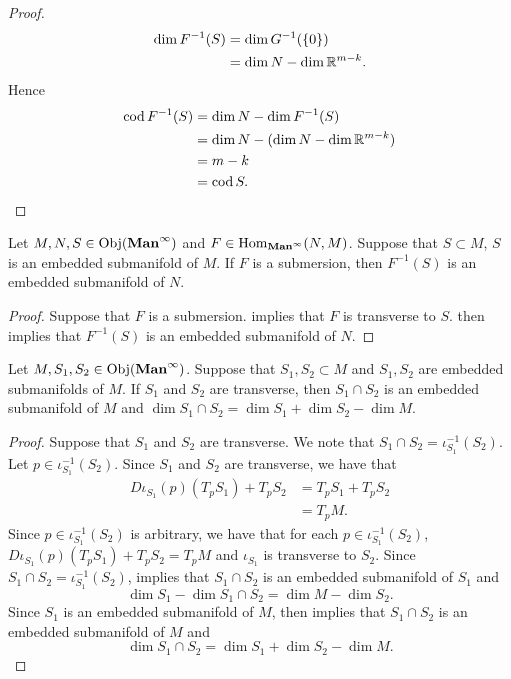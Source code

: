 \documentclass{book}
\begin{document}
\begin{proof}
		\begin{align*}
			\dim F^{-1}(S) 
			& = \dim G^{-1}(\{0\}) \\
			& = \dim N - \dim  \mathbb{R}^{m-k}.
		\end{align*}
		Hence
		\begin{align*}
			\operatorname{cod} F^{-1}(S)
			& = \dim N - \dim F^{-1}(S) \\
			& = \dim N - (\dim N - \dim \mathbb{R}^{m-k}) \\
			& = m - k \\
			& = \operatorname{cod} S.
		\end{align*}
	\end{proof}

	\begin{ex} 
		Let $M, N, S \in \operatorname{Obj}(\operatorname*{\text{\textbf{Man}}^{\infty}})$ and $F \in \operatorname{Hom}_{\operatorname*{\text{\textbf{Man}}^{\infty}}}(N, M)$. Suppose that $S \subset M$, $S$ is an embedded submanifold of $M$. If $F$ is a submersion, then $F^{-1}(S)$ is an embedded submanifold of $N$.
	\end{ex}

	\begin{proof}
		Suppose that $F$ is a submersion.  implies that $F$ is transverse to $S$.  then implies that $F^{-1}(S)$ is an embedded submanifold of $N$.
	\end{proof}

	\begin{ex} 
		Let $M, S_1, S_2 \in \operatorname{Obj}(\operatorname*{\text{\textbf{Man}}^{\infty}})$. Suppose that $S_1, S_2 \subset M$ and $S_1, S_2$ are embedded submanifolds of $M$. If $S_1$ and $S_2$ are transverse, then $S_1 \cap S_2$ is an embedded submanifold of $M$ and $\dim S_1 \cap S_2 = \dim S_1 + \dim S_2 - \dim M$. 
	\end{ex}

	\begin{proof}
		Suppose that $S_1$ and $S_2$ are transverse. We note that $S_1 \cap S_2 = \iota_{S_1}^{-1}(S_2)$. Let $p \in \iota_{S_1}^{-1}(S_2)$. Since $S_1$ and $S_2$ are transverse, we have that
		\begin{align*}
			D\iota_{S_1}(p)(T_p S_1) + T_pS_2
			& = T_p S_1 + T_p S_2 \\
			& = T_pM.
		\end{align*} 
		Since $p \in \iota_{S_1}^{-1}(S_2)$ is arbitrary, we have that for each $p \in \iota_{S_1}^{-1}(S_2)$, $D\iota_{S_1}(p)(T_p S_1) + T_pS_2 = T_pM$ and $\iota_{S_1}$ is transverse to $S_2$. Since $S_1 \cap S_2 = \iota_{S_1}^{-1}(S_2)$,  implies that $S_1 \cap S_2$ is an embedded submanifold of $S_1$ and 
		$$\dim S_1 - \dim S_1 \cap S_2 = \dim M - \dim S_2.$$ 
		Since $S_1$ is an embedded submanifold of $M$,   then implies that $S_1 \cap S_2$ is an embedded submanifold of $M$ and 
		$$\dim S_1 \cap S_2 = \dim S_1 + \dim S_2 - \dim M.$$
	\end{proof}
\end{document}
